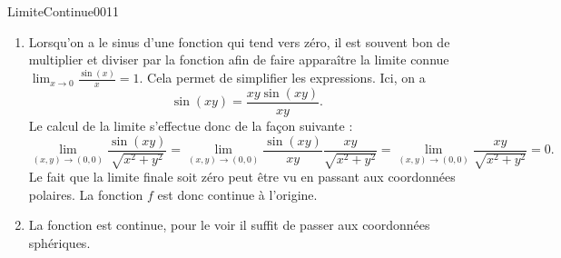 \begin{corrige}{LimiteContinue0011}

  \begin{enumerate}
  \item 

	  Lorsqu'on a le sinus d'une fonction qui tend vers zéro, il est souvent bon de multiplier et diviser par la fonction afin de faire apparaître la limite connue $\lim_{x\to 0} \frac{ \sin(x) }{ x }=1$. Cela permet de simplifier les expressions. Ici, on a
	  \begin{equation}
		  \sin(xy)=\frac{ xy\sin(xy) }{ xy }.
	  \end{equation}
	  Le calcul de la limite s'effectue donc de la façon suivante :
    \begin{equation}
	    \lim_{(x,y)\to (0,0)}\frac{\sin(xy)}{\sqrt{x^2+y^2}}=\lim_{(x,y)\to (0,0)}\frac{\sin(xy)}{xy}\frac{xy}{\sqrt{x^2+y^2}}=\lim_{(x,y)\to(0,0)}\frac{ xy }{ \sqrt{x^2+y^2} }=0.
    \end{equation}
    Le fait que la limite finale soit zéro peut être vu en passant aux coordonnées polaires. La fonction $f$ est donc continue à l'origine.

	\item
		La fonction est continue, pour le voir il suffit de passer aux coordonnées sphériques.  
  \end{enumerate}
  

\end{corrige}
